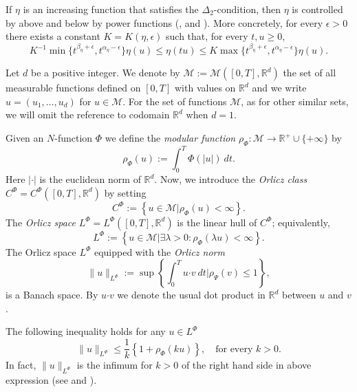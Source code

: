 \documentclass[twoside]{article}
\theoremstyle{remark}
\newcommand{\orlnor}{\|_{L^{\Phi}}}
\newcommand{\lphi}{L^{\Phi}}
\newcommand{\claseor}{C^{\Phi}}
\renewcommand{\b}[1]{\boldsymbol{#1}}
\newcommand{\rr}{\mathbb{R}}
\renewcommand{\leq}{\leqslant}
\renewcommand{\geq}{\geqslant}
\begin{document}
 If $\eta$ is an increasing function that satisfies the $\Delta_2$-condition, then $\eta$ is controlled by above and below
 by power functions (\cite[Sec. 1]{Gustavsson1977}, \cite[Eq. (2.3)-(2.4)]{fiorenza1997indices} and \cite[Thm. 11.13]{M}).   More concretely, for every $\epsilon>0$ there exists a
constant $K=K(\eta,\epsilon)$ such that, for every $t,u\geq 0$,
\begin{equation}\label{delta2-potencias}
    K^{-1}\min\big\{t^{\beta_{\eta}+\epsilon},t^{\alpha_{\eta}-\epsilon} \big\}\eta(u)\leq \eta(t u)\leq
    K\max\big\{t^{\beta_{\eta}+\epsilon},t^{\alpha_{\eta}-\epsilon} \big\}\eta(u).
\end{equation}



Let $d$ be a positive integer. We denote by $\mathcal{M}:=\mathcal{M}([0,T],\rr^d)$  the set of all measurable functions defined on $[0,T]$ with values on $\mathbb{R}^d$ and  we write $u=(u_1,\dots,u_d)$ for  $u\in \mathcal{M}$. For the set of functions $\mathcal{M}$, as for other similar sets, we will omit the reference to codomain $\mathbb{R}^d$ when $d=1$.


Given  an $N$-function $\Phi$ we define the \emph{modular function} 
$\rho_{\Phi}:\mathcal{M}\to \mathbb{R}^+\cup\{+\infty\}$ by
\[\rho_{\Phi}(u):= \int_0^T \Phi(|u|)\ dt.\]
Here $|\cdot|$ is the euclidean norm of $\mathbb{R}^d$.
Now, we introduce the \emph{Orlicz class} $C^{\Phi}=C^{\Phi}([0,T],\rr^d)$   by setting
\begin{equation}\label{claseOrlicz}
  C^{\Phi}:=\left\{u\in \mathcal{M} | \rho_{\Phi}(u)< \infty \right\}.
\end{equation}
The \emph{Orlicz space} $\lphi=L^{\Phi}([0,T],\rr^d)$ is the linear hull of $\claseor$;
equivalently,
\begin{equation}\label{espacioOrlicz}
\lphi:=\left\{ u\in \mathcal{M}| \exists \lambda>0: \rho_{\Phi}(\lambda u) < \infty   \right\}.
\end{equation}
  The Orlicz space $\lphi$ equipped with the \emph{Orlicz norm}
\[
\|  u  \orlnor:=\sup \left\{  \int_0^T u\b{\cdot} v\ dt \big| \rho_{\Psi}(v)\leq 1\right\},
\]
is a Banach space. By $u\b{\cdot} v$ we denote the usual dot product in $\mathbb{R}^{d}$ between $u$ and $v$.

The following  inequality holds for any $u\in\lphi$
\begin{equation}\label{amemiya-ine}
\|u\orlnor\leq \frac{1}{k}\left\{1+\rho_{\Phi}(ku)\right\},\quad\text{for every } k>0.
\end{equation}
In fact, $\|u\orlnor$ is the infimum for $k>0$ of the right hand side in above expression  (see \cite[Thm. 10.5]{KR} and \cite{hudzik2000amemiya}). 
\end{document}
